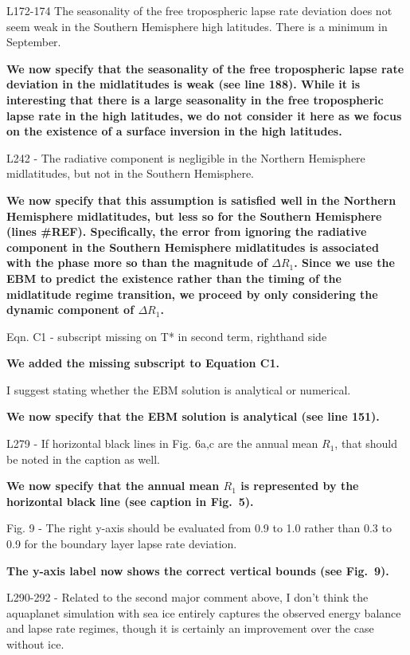 \documentclass{article}
\begin{document}
L172-174 The seasonality of the free tropospheric lapse rate deviation does not seem weak in the Southern Hemisphere high latitudes. There is a minimum in September.

\textbf{We now specify that the seasonality of the free tropospheric lapse rate deviation in the midlatitudes is weak (see line 188). While it is interesting that there is a large seasonality in the free tropospheric lapse rate in the high latitudes, we do not consider it here as we focus on the existence of a surface inversion in the high latitudes.}

L242 - The radiative component is negligible in the Northern Hemisphere midlatitudes, but not in the Southern Hemisphere.

\textbf{We now specify that this assumption is satisfied well in the Northern Hemisphere midlatitudes, but less so for the Southern Hemisphere (lines \#REF). Specifically, the error from ignoring the radiative component in the Southern Hemisphere midlatitudes is associated with the phase more so than the magnitude of $\Delta R_1$. Since we use the EBM to predict the existence rather than the timing of the midlatitude regime transition, we proceed by only considering the dynamic component of $\Delta R_1$.}

Eqn. C1 - subscript missing on T* in second term, righthand side

\textbf{We added the missing subscript to Equation C1.}

I suggest stating whether the EBM solution is analytical or numerical.

\textbf{We now specify that the EBM solution is analytical (see line 151).}

L279 - If horizontal black lines in Fig. 6a,c are the annual mean $R_1$, that should be noted in the caption as well.

\textbf{We now specify that the annual mean $R_1$ is represented by the horizontal black line (see caption in Fig.~5).}

Fig. 9 - The right y-axis should be evaluated from 0.9 to 1.0 rather than 0.3 to 0.9 for the boundary layer lapse rate deviation.

\textbf{The y-axis label now shows the correct vertical bounds (see Fig.~9).}

L290-292 - Related to the second major comment above, I don't think the aquaplanet simulation with sea ice entirely captures the observed energy balance and lapse rate regimes, though it is certainly an improvement over the case without ice.
\end{document}
